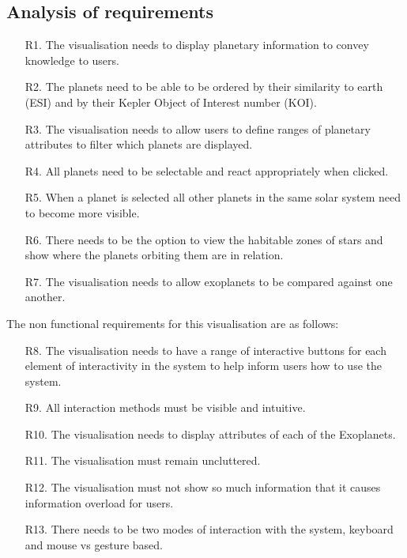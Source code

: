 \subsection{Analysis of requirements}
\begin{enumerate}

 \item[R1.] The visualisation needs to display planetary information to convey
knowledge to users.
 \item[R2.] The planets need to be able to be ordered by their similarity to
earth (ESI) and by their Kepler Object of Interest number (KOI).
 \item[R3.] The visualisation needs to allow users to define ranges of planetary
attributes to filter which planets are displayed.
 \item[R4.] All planets need to be selectable and react appropriately when
clicked.
 \item[R5.] When a planet is selected all other planets in the same solar system
need to become more visible.
 \item[R6.] There needs to be the option to view the habitable zones of stars
and show where the planets orbiting them are in relation.
 \item[R7.] The visualisation needs to allow exoplanets to be compared against
one another.
\end{enumerate}

 The non functional requirements for this visualisation are as follows:
\begin{enumerate}
 \item[R8.] The visualisation needs to have a range of interactive buttons for
each element of interactivity in the system to help inform users how to use the
system.
 \item[R9.] All interaction methods must be visible and intuitive.
 \item[R10.] The visualisation needs to display attributes of each of the
Exoplanets.
 \item[R11.] The visualisation must remain uncluttered.
 \item[R12.] The visualisation must not show so much information that it causes
information overload for users.
  \item[R13.] There needs to be two modes of interaction with the system,
keyboard and mouse vs gesture based.
\end{enumerate}

